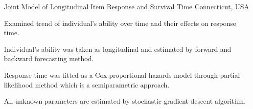 \begin{cventries}
  \cventry
    {} %
    {Joint Model of Longitudinal Item Response and Survival Time} %
    {Connecticut, USA} %
    {} %
    {
      \begin{cvitems} %
        \item {Examined trend of individual’s ability over time and their effects on response time.}
        \item {Individual’s ability was taken as longitudinal and estimated by forward and backward forecasting method.}
        \item {Response time was fitted as a Cox proportional hazards model through partial likelihood method which is a semiparametric approach.}
        \item {All unknown parameters are estimated by stochastic gradient descent algorithm.}
      \end{cvitems}
    }
    
\end{cventries}
